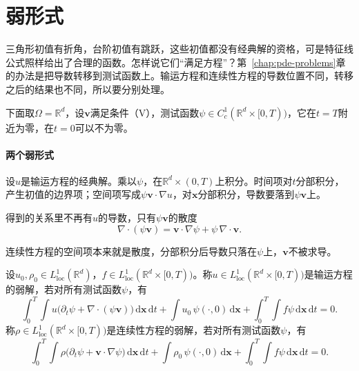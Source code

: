 \section{弱形式}
\label{sec:transp-weak}

三角形初值有折角，台阶初值有跳跃，这些初值都没有经典解的资格，可是特征线公式照样给出了合理的函数。怎样说它们“满足方程”？第~\ref{chap:pde-problems}章的办法是把导数转移到测试函数上。输运方程和连续性方程的导数位置不同，转移之后的结果也不同，所以要分别处理。

下面取$\Omega=\mathbb{R}^{d}$，设$\bm{v}$满足条件（V），测试函数$\psi\in C^{1}_{c}(\mathbb{R}^{d}\times[0,T))$，它在$t=T$附近为零，在$t=0$可以不为零。

\paragraph{两个弱形式}
设$u$是输运方程的经典解。乘以$\psi$，在$\mathbb{R}^{d}\times(0,T)$上积分。时间项对$t$分部积分，产生初值的边界项；空间项写成$\psi\bm{v}\cdot\nabla u$，对$\bm{x}$分部积分，导数要落到$\psi\bm{v}$上。

得到的关系里不再有$u$的导数，只有$\psi\bm{v}$的散度
\[
  \nabla\cdot(\psi\bm{v})=\bm{v}\cdot\nabla\psi+\psi\,\nabla\cdot\bm{v}.
\]

连续性方程的空间项本来就是散度，分部积分后导数只落在$\psi$上，$\bm{v}$不被求导。

\begin{definition}[输运方程与连续性方程的弱解]
\label{def:transp-weak}
设$u_0,\rho_0\in L^{1}_{\mathrm{loc}}(\mathbb{R}^{d})$，$f\in L^{1}_{\mathrm{loc}}(\mathbb{R}^{d}\times[0,T))$。称$u\in L^{1}_{\mathrm{loc}}(\mathbb{R}^{d}\times[0,T))$是输运方程的弱解，若对所有测试函数$\psi$，有
\begin{equation}
  \int_0^{T}\!\!\int u\bigl(\partial_t\psi+\nabla\cdot(\psi\bm{v})\bigr)\,\mathrm{d}\bm{x}\,\mathrm{d}t
  +\int u_0\,\psi(\cdot,0)\,\mathrm{d}\bm{x}
  +\int_0^{T}\!\!\int f\psi\,\mathrm{d}\bm{x}\,\mathrm{d}t=0.
  \label{eq:transp-weak-transport}
\end{equation}
称$\rho\in L^{1}_{\mathrm{loc}}(\mathbb{R}^{d}\times[0,T))$是连续性方程的弱解，若对所有测试函数$\psi$，有
\begin{equation}
  \int_0^{T}\!\!\int\rho\bigl(\partial_t\psi+\bm{v}\cdot\nabla\psi\bigr)\,\mathrm{d}\bm{x}\,\mathrm{d}t
  +\int\rho_0\,\psi(\cdot,0)\,\mathrm{d}\bm{x}
  +\int_0^{T}\!\!\int f\psi\,\mathrm{d}\bm{x}\,\mathrm{d}t=0.
  \label{eq:transp-weak-continuity}
\end{equation}
\end{definition}

